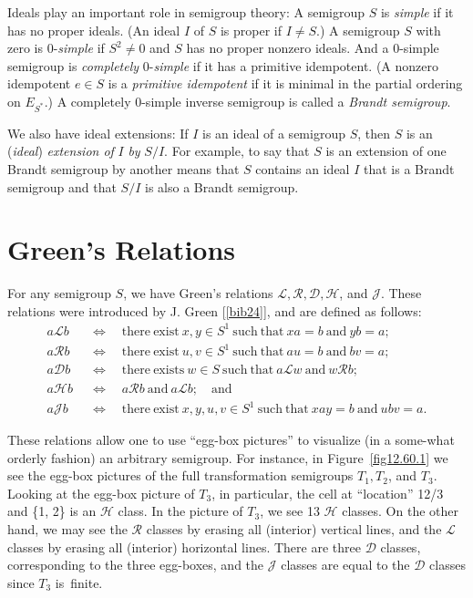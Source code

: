 \documentclass{surv-l}
\numberwithin{equation}{section}
\numberwithin{table}{section}
\numberwithin{figure}{section}
\theoremstyle{plain}
\theoremstyle{definition}
\begin{document}
Ideals play an important role in semigroup theory: A semigroup $S$
is \emph{simple} if it has no proper ideals. (An ideal $I$ of $S$
is proper if $I \neq S$.) A semigroup $S$ with zero is
$0$-\emph{simple} if $S^{2}\neq 0$ and $S$ has no proper nonzero
ideals. And a $0$-simple semigroup is
\emph{completely} $0$-\emph{simple}
if it has a primitive idempotent. (A nonzero idempotent $e\in S$
is a \emph{primitive idempotent} if it is minimal in the partial
ordering on $E_{S^{\ast}}.$) A completely $0$-simple
inverse semigroup is called a \emph{Brandt
semigroup}.

We also have ideal extensions: If $I$ is
an ideal of a semigroup $S$, then $S$ is an (\emph{ideal})
\emph{extension of} $I$ \emph{by} $S/I$. For example, to say that
$S$ is an extension of one Brandt semigroup by another means that
$S$ contains an ideal $I$ that is a Brandt semigroup and that
$S/I$ is also a Brandt semigroup.

\section{Green's Relations}\label{secA.77}

For any semigroup $S$, we have Green's relations $\mathcal{L},
\mathcal{R}, \mathcal{D}, \mathcal{H}$, and $\mathcal{J}$. These
relations were introduced by J. Green
[\ref{bib24}], and are defined as follows:
\begin{align*}
a\mathcal{L}b &\enspace \Leftrightarrow\quad \mathrm{there\ exist}\ x, y\in S^{1}\ \mathrm{such\
that}\ xa=b\ \mathrm{and}\ yb=a; \\
a\mathcal{R}b &\enspace \Leftrightarrow\quad \mathrm{there\ exist}\ u, v\in S^{1}\ \mathrm{such\
that}\ au=b\ \mathrm{and}\ bv =a; \\
a\mathcal{D}b &\enspace\Leftrightarrow\quad \mathrm{there\ exists}\ w\in S\ \mathrm{such\ that}\
a\mathcal{L}w\ \mathrm{and}\ w\mathcal{R}b; \\
a\mathcal{H}b&\enspace\Leftrightarrow\quad a\mathcal{R}b\ \mathrm{and}\ a\mathcal{L}b;\quad \mathrm{and} \\
a\mathcal{J}b &\enspace\Leftrightarrow\quad \mathrm{there\ exist}\ x, y, u, v\in S^{1}\ \mathrm{such\ that}\ xay=b\ \mathrm{and}\ ubv=a.
\end{align*}

These relations allow one to use ``egg-box pictures'' to visualize
(in a some-what orderly fashion) an arbitrary semigroup. For
instance, in Figure~\ref{fig12.60.1} we see the egg-box pictures
of the full transformation semigroups $T_{1}, T_{2}$, and $T_{3}$.
Looking at the egg-box picture of $T_{3}$, in particular, the cell
at ``location'' 12/3 and \{1, 2\} is an $\mathcal{H}$ class. In
the picture of $T_{3}$, we see 13 $\mathcal{H}$ classes. On the
other hand, we may see the $\mathcal{R}$ classes by erasing all
(interior) vertical lines, and the $\mathcal{L}$ classes by
erasing all (interior) horizontal lines. There are three
$\mathcal{D}$ classes, corresponding to the three egg-boxes, and
the $\mathcal{J}$ classes are equal to the $\mathcal{D}$ classes
since $T_{3}$ is~finite.
\end{document}
